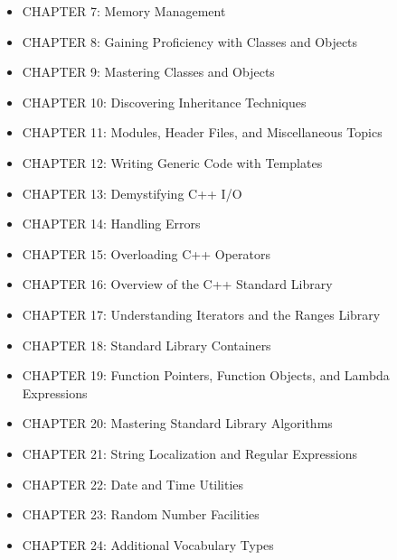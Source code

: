 \begin{itemize}
\item
CHAPTER 7: Memory Management

\item
CHAPTER 8: Gaining Proficiency with Classes and Objects

\item
CHAPTER 9: Mastering Classes and Objects

\item
CHAPTER 10: Discovering Inheritance Techniques

\item
CHAPTER 11: Modules, Header Files, and Miscellaneous Topics

\item
CHAPTER 12: Writing Generic Code with Templates

\item
CHAPTER 13: Demystifying C++ I/O

\item
CHAPTER 14: Handling Errors

\item
CHAPTER 15: Overloading C++ Operators

\item
CHAPTER 16: Overview of the C++ Standard Library

\item
CHAPTER 17: Understanding Iterators and the Ranges Library

\item
CHAPTER 18: Standard Library Containers

\item
CHAPTER 19: Function Pointers, Function Objects, and Lambda Expressions

\item
CHAPTER 20: Mastering Standard Library Algorithms

\item
CHAPTER 21: String Localization and Regular Expressions

\item
CHAPTER 22: Date and Time Utilities

\item
CHAPTER 23: Random Number Facilities

\item
CHAPTER 24: Additional Vocabulary Types
\end{itemize}